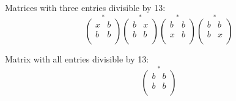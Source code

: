 \documentclass[12pt]{article}
\begin{document}
Matrices with three entries divisible by 13:
\[
\stackrel{*}
{
\left(\begin{matrix}
x & b \\
b & b \\
\end{matrix}\right)
}
\stackrel{*}
{
\left(\begin{matrix}
b & x \\
b & b \\
\end{matrix}\right)
}
\stackrel{*}
{
\left(\begin{matrix}
b & b \\
x & b \\
\end{matrix}\right)
}
\stackrel{*}
{
\left(\begin{matrix}
b & b \\
b & x \\
\end{matrix}\right)
}
\]

Matrix with all entries divisible by 13:
\[
\stackrel{*}
{
\left(\begin{matrix}
b & b \\
b & b \\
\end{matrix}\right)
}
\]
\end{document}

